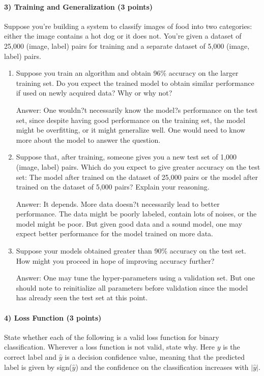 \documentclass[11pt]{article}
\begin{document}
	\paragraph{3) Training and Generalization (3 points)} Suppose you're building a system to classify images of food into two categories: either the image contains a hot dog or it does not. You're given a dataset of 25,000 (image, label) pairs for training and a separate dataset of 5,000 (image, label) pairs.
	\begin{enumerate}
		\item Suppose you train an algorithm and obtain 96\% accuracy on the larger training set. Do you expect the trained model to obtain similar performance if used on newly acquired data? Why or why not?\newline
		
		Answer: One wouldn?t necessarily know the model?s performance on the test set, since despite having good performance on the training set, the model might be overfitting, or it might generalize well. One would need to know more about the model to answer the question.
		
		\item Suppose that, after training, someone gives you a new test set of 1,000 (image, label) pairs. Which do you expect to give greater accuracy on the test set: The model after trained on the dataset of 25,000 pairs or the model after trained on the dataset of 5,000 pairs? Explain your reasoning.\newline
		
		Answer: It depends. More data doesn?t necessarily lead to better performance. The data might be poorly labeled, contain lots of noises, or the model might be poor. But given good data and a sound model, one may expect better performance for the model trained on more data.
		
		\item Suppose your models obtained greater than 90\% accuracy on the test set. How might you proceed in hope of improving accuracy further?\newline
		
		Answer: One may tune the hyper-parameters using a validation set. But one should note to reinitialize all parameters before validation since the model has already seen the test set at this point. 
	\end{enumerate}
	
	\paragraph{4) Loss Function (3 points)} State whether each of the following is a valid loss function 
	 for binary classification.  Wherever a loss function is not valid, state why. Here $y$ is the correct label and $\hat{y}$ is a decision confidence value, meaning that the predicted label is given by sign($\hat{y}$) and the confidence on the classification increases with $\vert\hat{y}\vert$.
	
\end{document}
